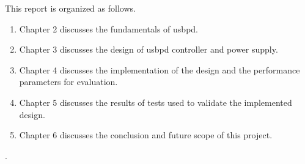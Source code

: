 This report is organized as follows.  
\begin{enumerate}
\renewcommand{\labelenumi}{\roman{enumi}}%
    \item Chapter 2 discusses the fundamentals of \gls{usbpd}. 
\item Chapter 3 discusses the design of \gls{usbpd} controller and power supply.
\item Chapter 4 discusses the implementation of the design and the performance parameters for evaluation.
\item Chapter 5 discusses the results of tests used to validate the implemented design.
\item Chapter 6 discusses the conclusion and future scope of this project. 
\end{enumerate}


.